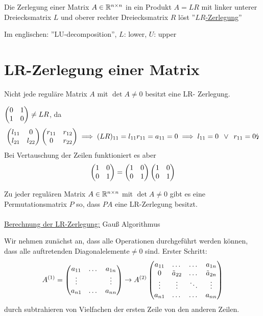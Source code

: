 \documentclass[../Skript.tex]{subfiles}
\begin{document}
\begin{definition}
    Die Zerlegung einer Matrix \(A\in\mathbb{R}^{n\times n}\) in ein Produkt 
    \(A=LR\) mit linker unterer Dreiecksmatrix \(L\) und oberer rechter 
    Dreiecksmatrix \(R\) löst ''\underline{\(LR\)-Zerlegung}''
\end{definition}
\begin{remark}
    Im englischen: ''LU-decomposition'', $L$: lower, $U$: upper
\end{remark}
\section{LR-Zerlegung einer Matrix}\begin{remark}
    Nicht jede reguläre Matrix $A$ mit $\det{A} \neq 0$ besitzt eine LR-
    Zerlegung.
\end{remark}
\begin{example}
    $\begin{pmatrix}0&1\\1&0\end{pmatrix} \neq LR$, da \[
    \begin{pmatrix}l_{11} & 0 \\ l_{21} & l_{22}\end{pmatrix}\begin{pmatrix}r_{11} & r_{12}\\ 0 & 
    r_{22}\end{pmatrix} \implies (LR)_{11} = l_{11}r_{11} = a_{11} = 0 \implies 
    l_{11} = 0 \hspace{.5em}\lor\hspace{.5em} r_{11} = 0 \text{\lightning}
    \]
    Bei Vertauschung der Zeilen funktioniert es aber \[
    \begin{pmatrix}1&0\\0&1\end{pmatrix} = \begin{pmatrix}1&0\\0&1\end{pmatrix}\begin{pmatrix}1&0\\0&1\end{pmatrix}
    \]
\end{example}
Zu jeder regulären Matrix $A\in \mathbb{R}^{n\times n}$ mit $\det{A} \neq 0$ gibt 
es eine Permutationsmatrix $P$ so, dass $PA$ eine LR-Zerlegung 
besitzt.\\\\
\underline{Berechnung der LR-Zerlegung:} Gauß Algorithmus

Wir nehmen zunächst an, dass alle Operationen durchgeführt werden können, 
dass alle auftretenden Diagonalelemente\(\neq 0\) sind.
Erster Schritt:\[
A^{(1)}=\begin{pmatrix}
    a_{11} & \dots & a_{1n} \\
    \vdots & \ & \vdots \\
    a_{n1} & \dots & a_{nn}
\end{pmatrix} \to  
A^{(2)}\begin{pmatrix}
    a_{11} & \dots & \dots  & a_{1n} \\
    0 & \Tilde{a}_{22} & \dots &\Tilde{a}_{2n}\\
    \vdots & \vdots & \ddots & \vdots \\
    a_{n1} & \dots & \dots & a_{nn}
\end{pmatrix}
\]
durch subtrahieren von Vielfachen der ersten Zeile von den anderen Zeilen.
\end{document}
